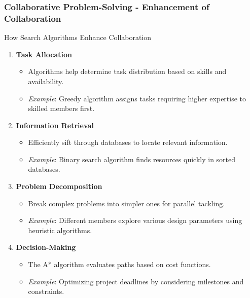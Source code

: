 \documentclass[aspectratio=169]{beamer}
\begin{document}
\begin{frame}[fragile]
    \frametitle{Collaborative Problem-Solving - Enhancement of Collaboration}
    \begin{block}{How Search Algorithms Enhance Collaboration}
        \begin{enumerate}
            \item \textbf{Task Allocation}
            \begin{itemize}
                \item Algorithms help determine task distribution based on skills and availability.
                \item \textit{Example}: Greedy algorithm assigns tasks requiring higher expertise to skilled members first.
            \end{itemize}
            
            \item \textbf{Information Retrieval}
            \begin{itemize}
                \item Efficiently sift through databases to locate relevant information.
                \item \textit{Example}: Binary search algorithm finds resources quickly in sorted databases.
            \end{itemize}
            
            \item \textbf{Problem Decomposition}
            \begin{itemize}
                \item Break complex problems into simpler ones for parallel tackling.
                \item \textit{Example}: Different members explore various design parameters using heuristic algorithms.
            \end{itemize}
            
            \item \textbf{Decision-Making}
            \begin{itemize}
                \item The A* algorithm evaluates paths based on cost functions.
                \item \textit{Example}: Optimizing project deadlines by considering milestones and constraints.
            \end{itemize}
        \end{enumerate}
    \end{block}
\end{frame}
\end{document}
